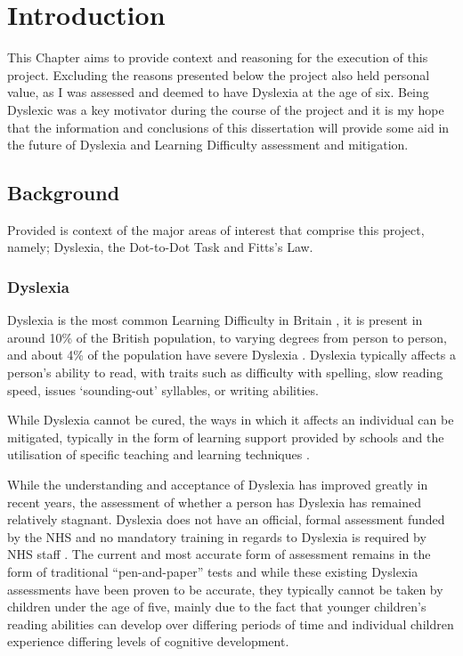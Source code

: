 \section{Introduction}
	This Chapter aims to provide context and reasoning for the execution of this project. Excluding the reasons presented below the project also held personal value, as I was assessed and deemed to have Dyslexia at the age of six. Being Dyslexic was a key motivator during the course of the project and it is my hope that the information and conclusions of this dissertation will provide some aid in the future of Dyslexia and Learning Difficulty assessment and mitigation.
	\subsection{Background}
		Provided is context of the major areas of interest that comprise this project, namely; Dyslexia, the Dot-to-Dot Task and Fitts's Law.
		\subsubsection{Dyslexia}
			Dyslexia is the most common Learning Difficulty in Britain \cite{BritishDyslexiaAssociation, NHSChoices}, it is present in around 10\% of the British population, to varying degrees from person to person, and about 4\% of the population have severe Dyslexia . Dyslexia typically affects a person's ability to read, with traits such as difficulty with spelling, slow reading speed, issues ‘sounding-out’ syllables, or writing abilities.
			
			While Dyslexia cannot be cured, the ways in which it affects an individual can be mitigated, typically in the form of learning support provided by schools and the utilisation of specific teaching and learning techniques \cite{BritishDyslexiaAssociation2016}.
			
			While the understanding and acceptance of Dyslexia has improved greatly in recent years, the assessment of whether a person has Dyslexia has remained relatively stagnant. Dyslexia does not have an official, formal assessment funded by the NHS and no mandatory training in regards to Dyslexia is required by NHS staff \cite{NHSChoicesa} . The current and most accurate form of assessment remains in the form of traditional “pen-and-paper” tests and while these existing Dyslexia assessments have been proven to be accurate, they typically cannot be taken by children under the age of five, mainly due to the fact that younger children’s reading abilities can develop over differing periods of time and individual children experience differing levels of cognitive development.
			

